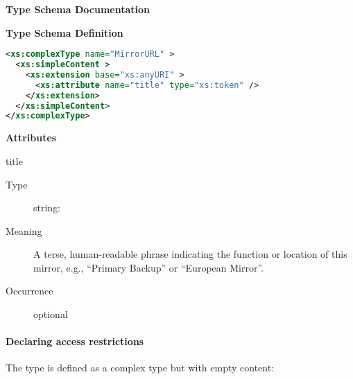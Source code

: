 \documentclass[11pt,a4paper]{ivoa}
\begin{document}
\begin{generated}
\begingroup
        \renewcommand*\descriptionlabel[1]{%
        \hbox to 5.5em{\emph{#1}\hfil}}\vspace{2ex}\noindent\textbf{ Type Schema Documentation}


\vspace{1ex}\noindent\textbf{ Type Schema Definition}

\begin{lstlisting}[language=XML,basicstyle=\footnotesize]
<xs:complexType name="MirrorURL" >
  <xs:simpleContent >
    <xs:extension base="xs:anyURI" >
      <xs:attribute name="title" type="xs:token" />
    </xs:extension>
  </xs:simpleContent>
</xs:complexType>
\end{lstlisting}

\vspace{0.5ex}\noindent\textbf{ Attributes}

\begingroup\small\begin{bigdescription}
\item[title]
\begin{description}
\item[Type] string: 
\item[Meaning]
                  A terse, human-readable phrase indicating the function
                  or location of this mirror, e.g., “Primary Backup” or
                  “European Mirror”.

\item[Occurrence] optional
\end{description}


\end{bigdescription}\endgroup

\endgroup
\end{generated}



\paragraph{Declaring access restrictions}

The  type is
defined as a complex type but with empty content:
\end{document}
